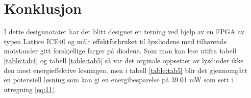 \pagebreak

\section{Konklusjon}
\label{konklusjon}


I dette designnotatet har det blitt designet en terning ved hjelp av en FPGA av typen Lattice ICE40 og målt effektforbruket til lysdiodene med tilhørende motstander gitt forskjellige farger på diodene. Som man kan lese utifra tabell \ref{table:tab4} og tabell \ref{table:tab5} så var det orginale oppsettet av lysdioder ikke den mest energieffektive løsningen, men i tabell \ref{table:tab5} blir det gjennomgått en potensiell løsning som kan gi en energibesparelse på 39.01 mW som sett i utregning \ref{eq:11}.
